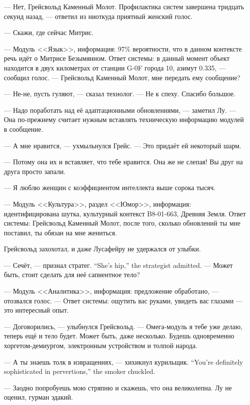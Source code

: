 --- Нет, Грейсвольд Каменный Молот.
Профилактика систем завершена тридцать секунд назад, --- ответил из ниоткуда приятный женский голос.

--- Скажи, где сейчас Митрис.

--- Модуль <<Язык>>, информация: 97\% вероятности, что в данном контексте речь идёт о Митрисе Безымянном.
Ответ системы: в данный момент объект находится в двух километрах от станции G-0F города 10, азимут 0.335, --- сообщил голос.
--- Грейсвольд Каменный Молот, мне передать ему сообщение?

--- Не-не, пусть гуляют, --- сказал технолог.
--- Не к спеху.
Спасибо большое.

--- Надо поработать над её адаптационными обновлениями, --- заметил Лу.
--- Она по-прежнему считает нужным вставлять техническую информацию модулей в сообщение.

--- А мне нравится, --- ухмыльнулся Грейс.
--- Это придаёт ей некоторый шарм.

--- Потому она их и вставляет, что тебе нравится.
Она же не слепая!
Вы друг на друга просто запали.

--- Я люблю женщин с коэффициентом интеллекта выше сорока тысяч.

--- Модуль <<Культура>>, раздел <<Юмор>>, информация: идентифицирована шутка, культурный контекст B8-01-663, Древняя Земля.
Ответ системы: Грейсвольд Каменный Молот, после того, сколько обновлений ты мне поставил, ты обязан на мне жениться.

Грейсвольд захохотал, и даже Лусафейру не удержался от улыбки.

{--- Сечёт, --- признал стратег.}
{``She's hip,'' the strategist admitted.}
--- Может быть, стоит сделать для неё сапиентное тело?

--- Модуль <<Аналитика>>, информация: предложение обработано, --- отозвался голос.
--- Ответ системы: ощутить вас руками, увидеть вас глазами --- это интересный опыт.

--- Договорились, --- улыбнулся Грейсвольд.
--- Омега-модуль я тебе уже делаю, теперь ещё и тело будет.
Может быть, даже несколько.
Будешь одновременно хоргетом-демиургом, электронным устройством и толпой народа.

{--- А ты знаешь толк в извращениях, --- хихикнул курильщик.}
{``You're definitely sophisticated in pervertions,'' the smoker chuckled.}

--- Заодно попробуешь мою стряпню и скажешь, что она великолепна.
Лу не оценил, гурман эдакий.

